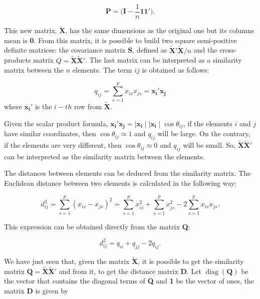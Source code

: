 \documentclass[11pt]{report}
\DeclareMathOperator{\diag}{diag}
\begin{document}
\[
\mathbf{P} = \Big( \mathbf{I} - \frac{1}{n} \mathbf{1}\mathbf{1'}\Big).
\]

\indent This new matrix, $\mathbf{\widetilde{X}}$, has the same dimensions as 
the original one but its columns mean is \textbf{0}. From this matrix, it is 
possible to build two square semi-positive definite matrices: the covariance 
matrix \textbf{S}, defined as $\mathbf{\widetilde{X}'}\mathbf{\widetilde{X}}/n$ 
and the cross-products matrix $Q = \mathbf{\widetilde{X}}\mathbf{\widetilde{X}'}$. 
The last matrix can be interpreted as a similarity matrix between the $n$ elements. 
The term $ij$ is obtained as follows:

\begin{equation} \label{qij}
q_{ij} = \sum_{s=1}^{p} x_{is}x_{js} = \mathbf{x_i'} \mathbf{x_j}
\end{equation}
where $\mathbf{x_i}'$ is the $i-th$ row from $\mathbf{\widetilde{X}}$. 

\indent Given the scalar product formula, 
${\mathbf{x_i'}\mathbf{x_j} =  \mid \mathbf{x_i} \mid \mid \mathbf{x_i} \mid \cos\theta_{ij}}$,
if the elements $i$ and $j$ have similar coordinates, then $\cos\theta_{ij} \simeq 1$
and $q_{ij}$ will be large. On the contrary, if the elements are very different,
then $\cos \theta_{ij} \simeq 0$ and $q_{ij}$ will be small. So, 
$\mathbf{\widetilde{X}}\mathbf{\widetilde{X}'}$ can be interpreted as the similarity
matrix between the elements.

\indent The distances between elements can be deduced from the similarity 
matrix. The Euclidean distance between two elements is calculated in the 
following way:

\begin{equation} \label{dij}
d^2_{ij} =  \sum_{s=1}^{p} (x_{is}- x_{js} )^2  = \sum_{s=1}^{p}x_{is}^2 + \sum_{s=1}^p x_{js}^2 - 2\sum_{s=1}^{p} x_{is}x_{js}.
\end{equation}

\indent This expression can be obtained directly from the matrix \textbf{Q}:

\begin{equation} \label{dfromq}
d^2_{ij} = q_{ii} + q_{jj} - 2q_{ij}.
\end{equation}

\indent We have just seen that, given the matrix $\mathbf{\widetilde{X}}$, 
it is possible to get the similarity matrix 
$\mathbf{Q} = \mathbf{\widetilde{X}}\mathbf{\widetilde{X}'}$ and from it, 
to get the distance matrix \textbf{D}. Let $\diag(\mathbf{Q})$ be the
vector that contains the diagonal terms of \textbf{Q} and \textbf{1} be the vector
of ones, the matrix \textbf{D} is given by
\end{document}
